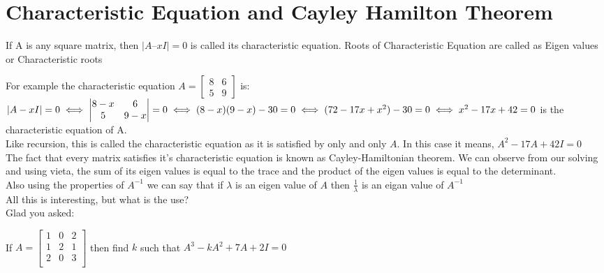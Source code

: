\section{Characteristic Equation and Cayley Hamilton Theorem}
\begin{definition}
 If A is any square matrix, then $|A –xI| = 0$ is called its characteristic equation. Roots of Characteristic Equation are called as Eigen values or Characteristic roots
\end{definition}
For example the characteristic equation $A=\begin{bmatrix}
    8 &6\\
    5 &9
\end{bmatrix}$ is:\\
$|A-xI|=0\\
\iff \begin{vmatrix}
    8-x &6\\
    5 & 9-x
\end{vmatrix} =0\\
\iff (8-x)(9-x)-30=0\\
\iff (72-17x+x^2)-30=0\\
\iff x^2-17x+42=0$
is the characteristic equation of A. \\
Like recursion, this is called the characteristic equation as it is satisfied by only and only $A$. In this case it means,  $A^2-17A+42I=0$\\
The fact that every matrix satisfies it's characteristic equation is known as Cayley-Hamiltonian theorem. We can observe from our solving and using vieta, the sum of its eigen values is equal to the trace and the product of the eigen values is equal to the determinant.\\
Also using the properties of $A^{-1}$ we can say that if $\lambda$ is an eigen value of $A$ then $\frac{1}{\lambda}$ is an eigan value of $A^{-1}$\\
All this is interesting, but what is the use?\\
Glad you asked:\\
\begin{example}
    If $A= \begin{bmatrix}
        1 &0 &2\\
        1 &2 &1\\
        2 &0 &3\\
    \end{bmatrix}$ then find $k$ such that $A^3 - kA^2 + 7A +2I=0$\\
\end{example}

